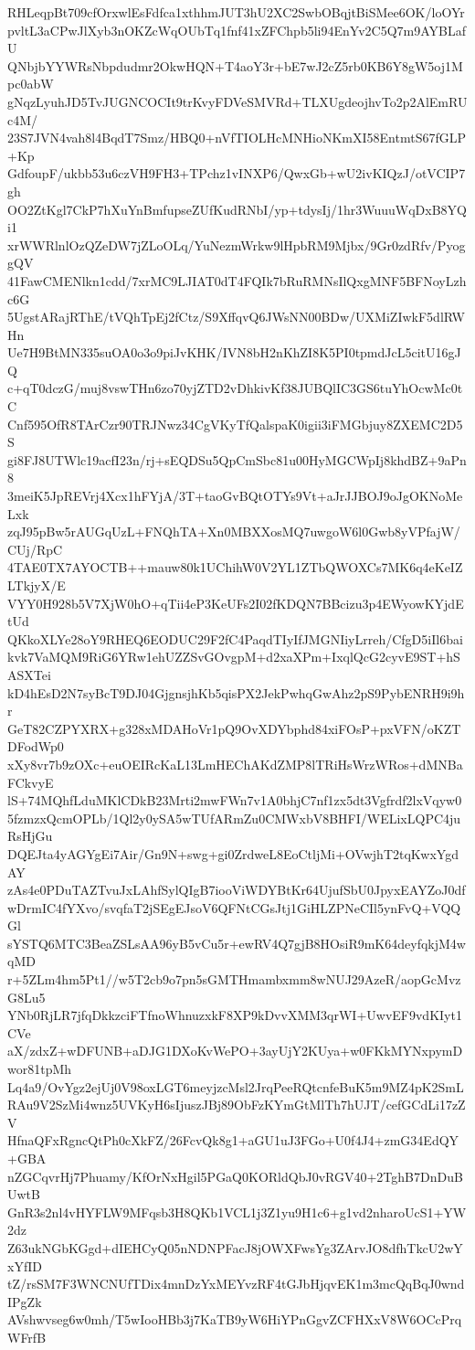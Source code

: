 RHLeqpBt709cfOrxwlEsFdfca1xthhmJUT3hU2XC2SwbOBqjtBiSMee6OK/loOYr
pvltL3aCPwJlXyb3nOKZcWqOUbTq1fnf41xZFChpb5li94EnYv2C5Q7m9AYBLafU
QNbjbYYWRsNbpdudmr2OkwHQN+T4aoY3r+bE7wJ2cZ5rb0KB6Y8gW5oj1Mpc0abW
gNqzLyuhJD5TvJUGNCOCIt9trKvyFDVeSMVRd+TLXUgdeojhvTo2p2AlEmRUc4M/
23S7JVN4vah8l4BqdT7Smz/HBQ0+nVfTIOLHcMNHioNKmXI58EntmtS67fGLP+Kp
GdfoupF/ukbb53u6czVH9FH3+TPchz1vINXP6/QwxGb+wU2ivKIQzJ/otVCIP7gh
OO2ZtKgl7CkP7hXuYnBmfupseZUfKudRNbI/yp+tdysIj/1hr3WuuuWqDxB8YQi1
xrWWRlnlOzQZeDW7jZLoOLq/YuNezmWrkw9lHpbRM9Mjbx/9Gr0zdRfv/PyoggQV
41FawCMENlkn1cdd/7xrMC9LJIAT0dT4FQIk7bRuRMNsIlQxgMNF5BFNoyLzhc6G
5UgstARajRThE/tVQhTpEj2fCtz/S9XffqvQ6JWsNN00BDw/UXMiZIwkF5dlRWHn
Ue7H9BtMN335suOA0o3o9piJvKHK/IVN8bH2nKhZI8K5PI0tpmdJcL5citU16gJQ
c+qT0dczG/muj8vswTHn6zo70yjZTD2vDhkivKf38JUBQlIC3GS6tuYhOcwMc0tC
Cnf595OfR8TArCzr90TRJNwz34CgVKyTfQalspaK0igii3iFMGbjuy8ZXEMC2D5S
gi8FJ8UTWlc19acfI23n/rj+sEQDSu5QpCmSbc81u00HyMGCWpIj8khdBZ+9aPn8
3meiK5JpREVrj4Xcx1hFYjA/3T+taoGvBQtOTYs9Vt+aJrJJBOJ9oJgOKNoMeLxk
zqJ95pBw5rAUGqUzL+FNQhTA+Xn0MBXXosMQ7uwgoW6l0Gwb8yVPfajW/CUj/RpC
4TAE0TX7AYOCTB++mauw80k1UChihW0V2YL1ZTbQWOXCs7MK6q4eKeIZLTkjyX/E
VYY0H928b5V7XjW0hO+qTii4eP3KeUFs2I02fKDQN7BBcizu3p4EWyowKYjdEtUd
QKkoXLYe28oY9RHEQ6EODUC29F2fC4PaqdTIyIfJMGNIiyLrreh/CfgD5iIl6bai
kvk7VaMQM9RiG6YRw1ehUZZSvGOvgpM+d2xaXPm+IxqlQcG2cyvE9ST+hSASXTei
kD4hEsD2N7syBcT9DJ04GjgnsjhKb5qisPX2JekPwhqGwAhz2pS9PybENRH9i9hr
GeT82CZPYXRX+g328xMDAHoVr1pQ9OvXDYbphd84xiFOsP+pxVFN/oKZTDFodWp0
xXy8vr7b9zOXc+euOEIRcKaL13LmHEChAKdZMP8lTRiHsWrzWRos+dMNBaFCkvyE
lS+74MQhfLduMKlCDkB23Mrti2mwFWn7v1A0bhjC7nf1zx5dt3Vgfrdf2lxVqyw0
5fzmzxQcmOPLb/1Ql2y0ySA5wTUfARmZu0CMWxbV8BHFI/WELixLQPC4juRsHjGu
DQEJta4yAGYgEi7Air/Gn9N+swg+gi0ZrdweL8EoCtljMi+OVwjhT2tqKwxYgdAY
zAs4e0PDuTAZTvuJxLAhfSylQIgB7iooViWDYBtKr64UjufSbU0JpyxEAYZoJ0df
wDrmIC4fYXvo/svqfaT2jSEgEJsoV6QFNtCGsJtj1GiHLZPNeCIl5ynFvQ+VQQGl
sYSTQ6MTC3BeaZSLsAA96yB5vCu5r+ewRV4Q7gjB8HOsiR9mK64deyfqkjM4wqMD
r+5ZLm4hm5Pt1//w5T2cb9o7pn5sGMTHmambxmm8wNUJ29AzeR/aopGcMvzG8Lu5
YNb0RjLR7jfqDkkzciFTfnoWhnuzxkF8XP9kDvvXMM3qrWI+UwvEF9vdKIyt1CVe
aX/zdxZ+wDFUNB+aDJG1DXoKvWePO+3ayUjY2KUya+w0FKkMYNxpymDwor81tpMh
Lq4a9/OvYgz2ejUj0V98oxLGT6meyjzcMsl2JrqPeeRQtcnfeBuK5m9MZ4pK2SmL
RAu9V2SzMi4wnz5UVKyH6sIjuszJBj89ObFzKYmGtMlTh7hUJT/cefGCdLi17zZV
HfnaQFxRgncQtPh0cXkFZ/26FcvQk8g1+aGU1uJ3FGo+U0f4J4+zmG34EdQY+GBA
nZGCqvrHj7Phuamy/KfOrNxHgil5PGaQ0KORldQbJ0vRGV40+2TghB7DnDuBUwtB
GnR3s2nl4vHYFLW9MFqsb3H8QKb1VCL1j3Z1yu9H1c6+g1vd2nharoUcS1+YW2dz
Z63ukNGbKGgd+dIEHCyQ05nNDNPFacJ8jOWXFwsYg3ZArvJO8dfhTkcU2wYxYfID
tZ/rsSM7F3WNCNUfTDix4mnDzYxMEYvzRF4tGJbHjqvEK1m3mcQqBqJ0wndIPgZk
AVshwvseg6w0mh/T5wIooHBb3j7KaTB9yW6HiYPnGgvZCFHXxV8W6OCcPrqWFrfB
